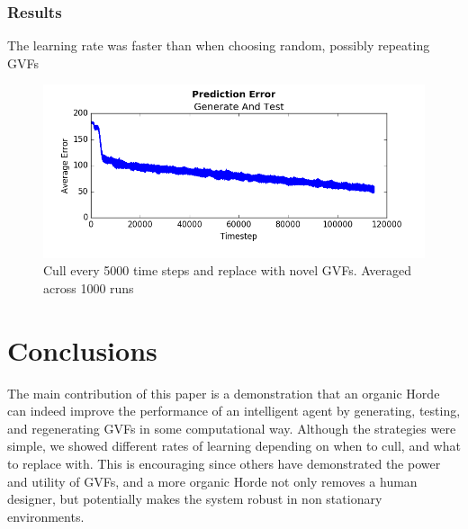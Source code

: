 \documentclass[letterpaper]{article}
\begin{document}
\subsubsection{Results}
The learning rate was faster than when choosing random, possibly repeating GVFs 

\begin{figure}[H]
  \centerline{\includegraphics[width = \linewidth]{Plots/AverageErrorKullEvery500011000Steps1000Runs.png}}
  \caption{Cull every 5000 time steps and replace with novel GVFs. Averaged across 1000 runs}
  \label{fig:experiment}
\end{figure}

\section{Conclusions}
The main contribution of this paper is a demonstration that an organic Horde can indeed improve the performance of an intelligent agent by generating, testing, and regenerating GVFs in some computational way. Although the strategies were simple, we showed different rates of learning depending on when to cull, and what to replace with. This is encouraging since others have demonstrated the power and utility of GVFs, and a more organic Horde not only removes a human designer, but potentially makes the system robust in non stationary environments. 
\end{document}

